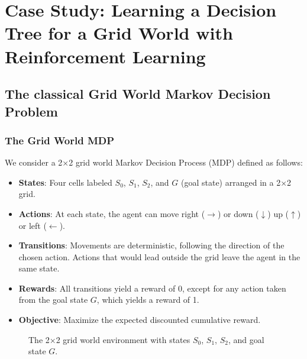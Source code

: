 \chapter{Case Study: Learning a Decision Tree for a Grid World with Reinforcement Learning}

\section{The classical Grid World Markov Decision Problem}
\subsection{The Grid World MDP}
We consider a 2×2 grid world Markov Decision Process (MDP) defined as follows:
\begin{itemize}
    \item \textbf{States}: Four cells labeled $S_0$, $S_1$, $S_2$, and $G$ (goal state) arranged in a 2×2 grid.
    \item \textbf{Actions}: At each state, the agent can move right ($\rightarrow$) or down ($\downarrow$) up ($\uparrow$) or left ($\leftarrow$).
    \item \textbf{Transitions}: Movements are deterministic, following the direction of the chosen action. Actions that would lead outside the grid leave the agent in the same state.
    \item \textbf{Rewards}: All transitions yield a reward of 0, except for any action taken from the goal state $G$, which yields a reward of 1.
    \item \textbf{Objective}: Maximize the expected discounted cumulative reward.
\end{itemize}

\begin{figure}[ht]
\centering
{}
\caption{The 2×2 grid world environment with states $S_0$, $S_1$, $S_2$, and goal state $G$.}\label{fig:grid-world}
\end{figure}

